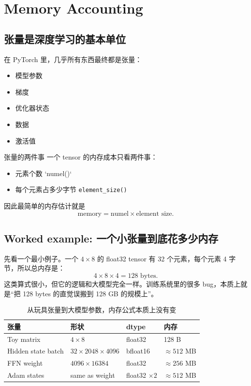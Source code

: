 \section{Memory Accounting}

\subsection{张量是深度学习的基本单位}

在 PyTorch 里，几乎所有东西最终都是张量：
\begin{itemize}
    \item 模型参数
    \item 梯度
    \item 优化器状态
    \item 数据
    \item 激活值
\end{itemize}

\begin{knowledgebox}{张量的两件事}
一个 tensor 的内存成本只看两件事：
\begin{itemize}
    \item 元素个数 `numel()`
    \item 每个元素占多少字节 \texttt{element\_size()}
\end{itemize}
因此最简单的内存估计就是
\[
\text{memory} = \text{numel} \times \text{element size}.
\]
\end{knowledgebox}

\subsection{Worked example: 一个小张量到底花多少内存}

先看一个最小例子。一个 \(4\times 8\) 的 float32 tensor 有 32 个元素，每个元素 4 字节，所以总内存是：
\[
4 \times 8 \times 4 = 128 \text{ bytes}.
\]
这类算式很小，但它的逻辑和大模型完全一样。训练系统里的很多 bug，本质上就是“把 128 bytes 的直觉误搬到 128 GB 的规模上”。

\begin{table}[H]
\centering
\begin{tabular}{p{}p{}p{}p{}}
\toprule
\textbf{张量} & \textbf{形状} & \textbf{dtype} & \textbf{内存} \\
\midrule
Toy matrix & \(4\times 8\) & float32 & 128 B \\
Hidden state batch & \(32\times 2048\times 4096\) & bfloat16 & \(\approx 512\) MB \\
FFN weight & \(4096\times 16384\) & float32 & \(\approx 256\) MB \\
Adam states & same as weight & float32 \(\times 2\) & \(\approx 512\) MB \\
\bottomrule
\end{tabular}
\caption{从玩具张量到大模型参数，内存公式本质上没有变}
\end{table}

